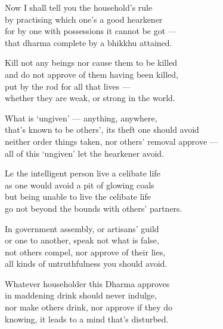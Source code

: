 \begin{MyDescription}{}
Now I shall tell you the household's rule\\
by practising which one's a good hearkener\\
for by one with possessions it cannot be got —\\
that dharma complete by a bhikkhu attained.
\end{MyDescription}

\begin{MyDescription}{}
Kill not any beings nor cause them to be killed\\
and do not approve of them having been killed,\\
put by the rod for all that lives —\\
whether they are weak, or strong in the world.
\end{MyDescription}

\begin{MyDescription}{}
What is `ungiven' — anything, anywhere,\\
that's known to be others', its theft one should avoid\\
neither order things taken, nor others' removal approve —\\
all of this `ungiven' let the hearkener avoid.
\end{MyDescription}

\begin{MyDescription}{}
Le the intelligent person live a celibate life\\
as one would avoid a pit of glowing coals\\
but being unable to live the celibate life\\
go not beyond the bounds with others' partners.
\end{MyDescription}

\begin{MyDescription}{}
In government assembly, or artisans' guild\\
or one to another, speak not what is false,\\
not others compel, nor approve of their lies,\\
all kinds of untruthfulness you should avoid.
\end{MyDescription}

\begin{MyDescription}{}
Whatever householder this Dharma approves\\
in maddening drink should never indulge,\\
nor make others drink, nor approve if they do\\
knowing, it leads to a mind that's disturbed.
\end{MyDescription}

